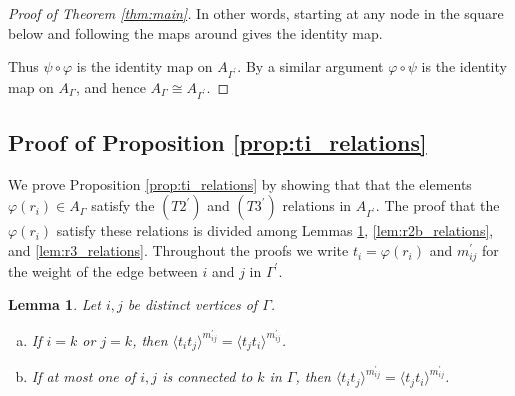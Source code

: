 \documentclass[11pt]{amsart}
\newtheorem{lem}[thm]{Lemma}
\theoremstyle{definition}
\begin{document}
\begin{proof}[Proof of Theorem \ref{thm:main}]
In other words, starting at any node in the square below and following the maps around gives the identity map.

\begin{figure}[h]
\hspace*{-4em}
\end{figure}

Thus $\psi\circ\varphi$ is the identity map on $A_{\Gamma^{\prime}}$.  By a similar argument $\varphi\circ\psi$ is the identity map on $A_\Gamma$, and hence $A_\Gamma\cong A_{\Gamma^{\prime}}$.
\end{proof}


\subsection{Proof of Proposition \ref{prop:ti_relations}}\label{sec:proof_of_ti_relations}

We prove Proposition \ref{prop:ti_relations} by showing that that the elements $\varphi(r_i)\in A_\Gamma$ satisfy the $(T2^\prime)$ and $(T3^\prime)$ relations in $A_{\Gamma^\prime}$.  The proof that the $\varphi(r_i)$ satisfy these relations is divided among Lemmas \ref{lem:r2a_relations}, \ref{lem:r2b_relations}, and \ref{lem:r3_relations}.  Throughout the proofs we write $t_i = \varphi(r_i)$ and $m_{ij}^\prime$ for the weight of the edge between $i$ and $j$ in $\Gamma^\prime$.


\begin{lem}\label{lem:r2a_relations}
Let $i,j$ be distinct vertices of $\Gamma$.
\begin{enumerate}[(a)]
\item If $i=k$ or $j=k$, then $\langle t_it_j \rangle^{m_{ij}^\prime} = \langle t_jt_i \rangle^{m_{ij}^\prime}$.
\item If at most one of $i,j$ is connected to $k$ in $\Gamma$, then $\langle t_it_j \rangle^{m_{ij}^\prime} = \langle t_jt_i \rangle^{m_{ij}^\prime}$.
\end{enumerate}
\end{lem}
\end{document}
